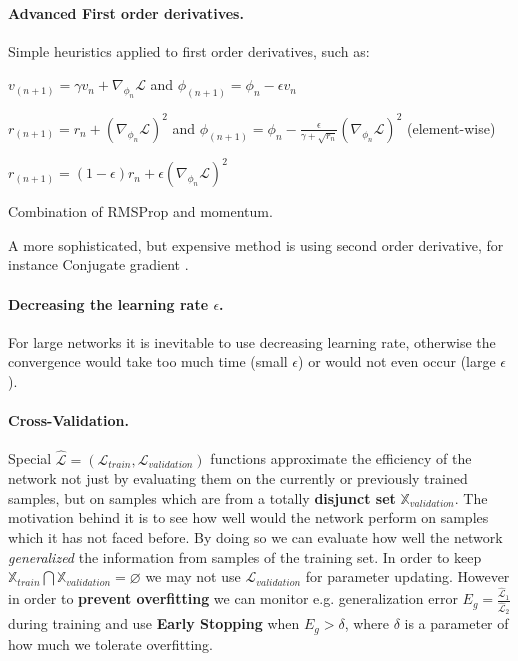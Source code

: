 \paragraph{Advanced First order derivatives.} 
Simple heuristics applied to first order derivatives, such as:

\begin{description}[align=right,labelwidth=3cm]
\item[Momentum] \cite{sutskever2013importance}
    $v_{(n+1)}=\gamma v_{n} + \nabla_{\phi_n}\mathcal{L}$ and 
    $\phi_{(n+1)} = \phi_n -\epsilon v_n$
\item[Adagrad] \cite{duchi2011adaptive}
    $r_{(n+1)}=r_n+\left(\nabla_{\phi_n}\mathcal{L}\right)^2$  and 
    $\phi_{(n+1)} = \phi_n - \frac{\epsilon}{\gamma + \sqrt{r_n}} \left(\nabla_{\phi_n}\mathcal{L}\right)^2$ (element-wise) 
\item[RMSProp] \cite{rmsprop} $r_{(n+1)}=(1-\epsilon)r_n + \epsilon\left(\nabla_{\phi_n}\mathcal{L}\right)^2$
\item[Adam] \cite{kingma2014adam} Combination of RMSProp and momentum.
\end{description}
A more sophisticated, but expensive method is using second order derivative, for instance Conjugate gradient \cite{shewchuk1994introduction}.

\paragraph{Decreasing the learning rate $\epsilon$.}
For large networks it is inevitable to use decreasing learning rate, otherwise the convergence would take too much time (small $\epsilon$) or would not even occur (large $\epsilon$). 

\paragraph{Cross-Validation.} Special $\hat{\mathcal{L}}=(\mathcal{L}_{train}, \mathcal{L}_{validation})$ functions approximate the efficiency of the network not just by evaluating them on the currently or previously trained samples, but on samples which are from a totally \textbf{disjunct set} $\mathbb{X}_{validation}$.
The motivation behind it is to see how well would the network perform on samples which it has not faced before.
By doing so we can evaluate how well the network \emph{generalized} the information from samples of the training set.
In order to keep $\mathbb{X}_{train} \bigcap \mathbb{X}_{validation} = \varnothing$ we may not use $\mathcal{L}_{validation}$ for parameter updating.
However in order to \textbf{prevent overfitting} we can monitor e.g. generalization error $E_g=\frac{\hat{\mathcal{L}}_1}{\hat{\mathcal{L}}_2}$ during training 
and use \textbf{Early Stopping} when $E_g > \delta$, where $\delta$ is a parameter of how much we tolerate overfitting.

